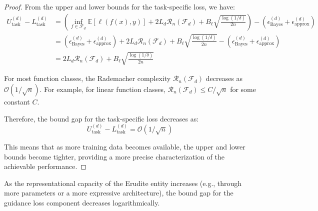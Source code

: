 \begin{proof}
From the upper and lower bounds for the task-specific loss, we have:
\begin{align}
U_{\text{task}}^{(d)} - L_{\text{task}}^{(d)} &= \left(\inf_{f \in \mathcal{F}_d} \mathbb{E}[\ell(f(x), y)] + 2L_d\mathcal{R}_n(\mathcal{F}_d) + B_{\ell}\sqrt{\frac{\log(1/\delta)}{2n}}\right) - \left(\epsilon_{\text{Bayes}}^{(d)} + \epsilon_{\text{approx}}^{(d)}\right) \\
&= \left(\epsilon_{\text{Bayes}}^{(d)} + \epsilon_{\text{approx}}^{(d)}\right) + 2L_d\mathcal{R}_n(\mathcal{F}_d) + B_{\ell}\sqrt{\frac{\log(1/\delta)}{2n}} - \left(\epsilon_{\text{Bayes}}^{(d)} + \epsilon_{\text{approx}}^{(d)}\right) \\
&= 2L_d\mathcal{R}_n(\mathcal{F}_d) + B_{\ell}\sqrt{\frac{\log(1/\delta)}{2n}}
\end{align}

For most function classes, the Rademacher complexity $\mathcal{R}_n(\mathcal{F}_d)$ decreases as $\mathcal{O}(1/\sqrt{n})$. For example, for linear function classes, $\mathcal{R}_n(\mathcal{F}_d) \leq C/\sqrt{n}$ for some constant $C$.

Therefore, the bound gap for the task-specific loss decreases as:
\begin{equation}
U_{\text{task}}^{(d)} - L_{\text{task}}^{(d)} = \mathcal{O}(1/\sqrt{n})
\end{equation}

This means that as more training data becomes available, the upper and lower bounds become tighter, providing a more precise characterization of the achievable performance.
\end{proof}

\begin{theorem}
As the representational capacity of the Erudite entity increases (e.g., through more parameters or a more expressive architecture), the bound gap for the guidance loss component decreases logarithmically.
\end{theorem}

